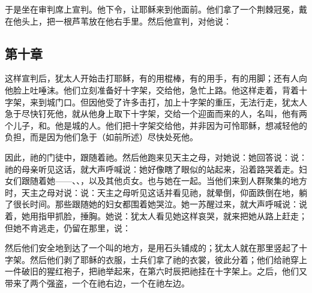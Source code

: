 于是坐在审判席上宣判。他下令，让耶稣来到他面前。他们拿了一个荆棘冠冕，戴在他头上，把一根芦苇放在他右手里。然后他宣判，对他说：\par


\subsection{第十章}

这样宣判后，犹太人开始击打耶稣，有的用棍棒，有的用手，有的用脚；还有人向他脸上吐唾沫。他们立刻准备好十字架，交给他，急忙上路。他这样走着，背着十字架，来到城门口。但因他受了许多击打，加上十字架的重压，无法行走，犹太人急于尽快钉死他，就从他身上取下十字架，交给一个迎面而来的人，名叫，他有两个儿子，和。他是城的人。他们把十字架交给他，并非因为可怜耶稣，想减轻他的负担，而是因为他们急于（如前所述）尽快处死他。\par

因此，祂的门徒中，跟随着祂。然后他跑来见天主之母，对她说：她回答说：说：祂的母亲听见这话，就大声呼喊说：她好像瞎了眼似的站起来，沿着路哭着走。妇女们跟随着她——、、，以及其他贞女。也与她在一起。当他们来到人群聚集的地方时，天主之母对说：说：天主之母听见这话并看见祂，就晕倒，仰面跌倒在地，躺了很长时间。那些跟随她的妇女都围着她哭泣。她一苏醒过来，就大声呼喊说：说着，她用指甲抓脸，捶胸。她说：犹太人看见她这样哀哭，就来把她从路上赶走；但她不肯逃走，仍留在那里，说：\par

然后他们安全地到达了一个叫的地方，是用石头铺成的；犹太人就在那里竖起了十字架。然后他们剥了耶稣的衣服，士兵们拿了祂的衣裳，彼此分着；他们给祂穿上一件破旧的猩红袍子，把祂举起来，在第六时辰把祂挂在十字架上。之后，他们又带来了两个强盗，一个在祂右边，一个在祂左边。\par

